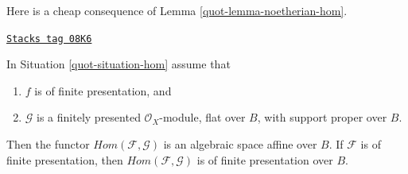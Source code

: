 Here is a cheap consequence of Lemma \ref{quot-lemma-noetherian-hom}.

\begin{proposition}[Hom]
\label{quot-proposition-hom}
\href{https://stacks.math.columbia.edu/tag/08K6}{\texttt{Stacks tag 08K6}}

In Situation \ref{quot-situation-hom} assume that
\begin{enumerate}
\item $f$ is of finite presentation, and
\item $\mathcal{G}$ is a finitely presented $\mathcal{O}_X$-module,
flat over $B$, with support proper over $B$.
\end{enumerate}
Then the functor $\mathit{Hom}(\mathcal{F}, \mathcal{G})$ is
an algebraic space affine over $B$. If $\mathcal{F}$
is of finite presentation, then $\mathit{Hom}(\mathcal{F}, \mathcal{G})$
is of finite presentation over $B$.
\end{proposition}

